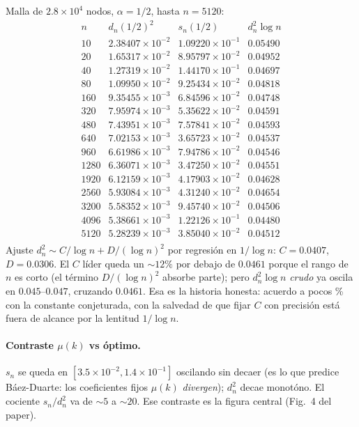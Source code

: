 \documentclass[11pt]{article}
\begin{document}
Malla de $2.8\times10^4$ nodos, $\alpha=1/2$, hasta $n=5120$:
\[
\begin{array}{r|ccc}
n & d_n(1/2)^2 & s_n(1/2) & d_n^2\log n\\
\hline
10   & 2.38407\times10^{-2} & 1.09220\times10^{-1} & 0.05490\\
20   & 1.65317\times10^{-2} & 8.95797\times10^{-2} & 0.04952\\
40   & 1.27319\times10^{-2} & 1.44170\times10^{-1} & 0.04697\\
80   & 1.09950\times10^{-2} & 9.25434\times10^{-2} & 0.04818\\
160  & 9.35455\times10^{-3} & 6.84596\times10^{-2} & 0.04748\\
320  & 7.95974\times10^{-3} & 5.35622\times10^{-2} & 0.04591\\
480  & 7.43951\times10^{-3} & 7.57841\times10^{-2} & 0.04593\\
640  & 7.02153\times10^{-3} & 3.65723\times10^{-2} & 0.04537\\
960  & 6.61986\times10^{-3} & 7.94786\times10^{-2} & 0.04546\\
1280 & 6.36071\times10^{-3} & 3.47250\times10^{-2} & 0.04551\\
1920 & 6.12159\times10^{-3} & 4.17903\times10^{-2} & 0.04628\\
2560 & 5.93084\times10^{-3} & 4.31240\times10^{-2} & 0.04654\\
3200 & 5.58352\times10^{-3} & 9.45740\times10^{-2} & 0.04506\\
4096 & 5.38661\times10^{-3} & 1.22126\times10^{-1} & 0.04480\\
5120 & 5.28239\times10^{-3} & 3.85040\times10^{-2} & 0.04512\\
\end{array}
\]
Ajuste $d_n^2\sim C/\log n+D/(\log n)^2$ por regresi\'on en $1/\log n$:
$C=0.0407$, $D=0.0306$. El $C$ l\'ider queda un $\sim12\%$ por debajo de $0.0461$ porque
el rango de $n$ es corto (el t\'ermino $D/(\log n)^2$ absorbe parte); pero
$d_n^2\log n$ \emph{crudo} ya oscila en $0.045$--$0.047$, cruzando $0.0461$. Esa es la
historia honesta: acuerdo a pocos \% con la constante conjeturada, con la salvedad de
que fijar $C$ con precisi\'on est\'a fuera de alcance por la lentitud $1/\log n$.

\paragraph{Contraste $\mu(k)$ vs \'optimo.} $s_n$ se queda en $[3.5\times10^{-2},
1.4\times10^{-1}]$ oscilando sin decaer (es lo que predice B\'aez-Duarte: los
coeficientes fijos $\mu(k)$ \emph{divergen}); $d_n^2$ decae monot\'ono. El cociente
$s_n/d_n^2$ va de $\sim5$ a $\sim20$. Ese contraste es la figura central (Fig.~4 del
paper).
\end{document}
